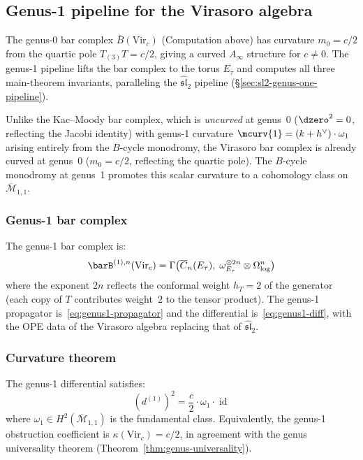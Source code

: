 \subsection{Genus-1 pipeline for the Virasoro algebra}
\label{sec:virasoro-genus-one-pipeline}

The genus-0 bar complex $\bar{B}(\mathrm{Vir}_c)$ (Computation above)
has curvature $m_0 = c/2$ from the quartic pole $T_{(3)}T = c/2$, giving a curved
$A_\infty$ structure for $c \neq 0$.  The genus-1 pipeline lifts the bar complex to the torus $E_\tau$ and computes all three
main-theorem invariants, paralleling the
$\widehat{\mathfrak{sl}}_2$ pipeline (\S\ref{sec:sl2-genus-one-pipeline}).

Unlike the Kac--Moody bar complex, which is
\emph{uncurved} at genus~0 ($\dzero^2 = 0$, reflecting the Jacobi identity) with
genus-1 curvature $\mcurv{1} = (k+h^\vee)\cdot\omega_1$ arising entirely from the $B$-cycle
monodromy, the Virasoro bar complex is already curved at genus~0
($m_0 = c/2$, reflecting the quartic pole).  The $B$-cycle monodromy at
genus~1 promotes this scalar curvature to a cohomology class on
$\overline{\mathcal{M}}_{1,1}$.

\subsubsection{Genus-1 bar complex}

The genus-1 bar complex is:
\begin{equation}\label{eq:vir-genus1-bar}
\barB^{(1),n}(\mathrm{Vir}_c) = \Gamma\bigl(\overline{C}_n(E_\tau),\;
  \omega_{E_\tau}^{\otimes 2n} \otimes \Omega^n_{\log}\bigr)
\end{equation}
where the exponent $2n$ reflects the conformal weight $h_T = 2$ of the
generator (each copy of $T$ contributes weight~$2$ to the tensor product).
The genus-1 propagator is~\eqref{eq:genus1-propagator}
and the differential is~\eqref{eq:genus1-diff}, with the OPE data of the
Virasoro algebra replacing that of $\widehat{\mathfrak{sl}}_2$.

\subsubsection{Curvature theorem}

\begin{theorem}
\label{thm:vir-genus1-curvature}
The genus-1 differential satisfies:
\begin{equation}\label{eq:vir-genus1-dsquared}
(d^{(1)})^2 = \frac{c}{2} \cdot \omega_1 \cdot \operatorname{id}
\end{equation}
where $\omega_1 \in H^2(\overline{\mathcal{M}}_{1,1})$ is the fundamental class.
Equivalently, the genus-1 obstruction coefficient is
$\kappa(\mathrm{Vir}_c) = c/2$, in agreement with the genus universality
theorem (Theorem~\ref{thm:genus-universality}).
\end{theorem}

